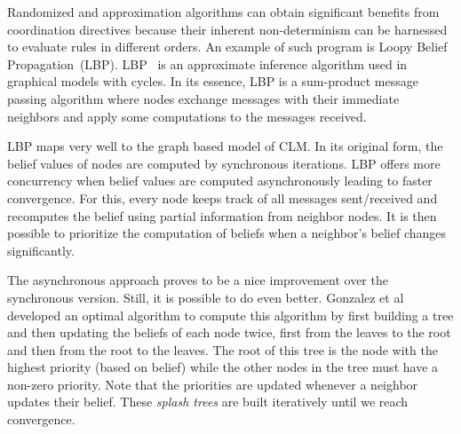 Randomized and approximation algorithms can obtain significant benefits from
coordination directives because their inherent non-determinism can be harnessed
to evaluate rules in different orders.
An example of such program is Loopy Belief Propagation~(LBP).
LBP~\cite{Murphy99loopybelief} is an approximate inference algorithm
used in graphical models with cycles. In its essence, LBP is a sum-product message passing algorithm
where nodes exchange messages with their immediate neighbors and apply some computations to the messages
received.

LBP maps very well to the graph based model of CLM. In its
original form, the belief values of nodes are computed by synchronous iterations.
LBP offers more concurrency when belief values are computed asynchronously
leading to faster convergence. For this, every node keeps track of all messages
sent/received and recomputes the belief using partial information from neighbor
nodes. It is then possible to prioritize the computation of beliefs when a
neighbor's belief changes significantly.

The asynchronous approach proves to be a nice improvement over the synchronous
version. Still, it is possible to do even better. Gonzalez et
al~\cite{Gonzalez+al:aistats09paraml} developed an optimal algorithm to compute
this algorithm by first building a tree and then updating the beliefs of each
node twice, first from the leaves to the root and then from the root to the
leaves. The root of this tree is the node with the highest priority (based on
belief) while the other nodes in the tree must have a non-zero priority.
Note that the priorities are updated whenever a neighbor updates their belief.
These \emph{splash trees} are built iteratively until we reach convergence.

